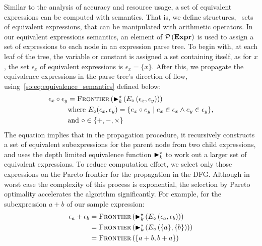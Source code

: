 Similar to the analysis of accuracy and resource usage, a set of equivalent
expressions can be computed with semantics. That is, we define structures,
\ie~sets of equivalent expressions, that can be manipulated with arithmetic
operators. In our equivalent expressions semantics, an element of
$\mathcal{P}\left({\mathbf{Expr}}\right)$ is used to assign a set of expressions to each node
in an expression parse tree. To begin with, at each leaf of the tree, the
variable or constant is assigned a set containing itself, as for $x$, the set
$\epsilon_x$ of equivalent expressions is $\epsilon_x = \{x\}$. After this, we
propagate the equivalence expressions in the parse tree's direction of flow,
using~\eqref{so:eq:equivalence_semantics} defined below:
\begin{equation}
    \begin{aligned}
        \epsilon_x \circ \epsilon_y &= \operatorname{\textsc{Frontier}}\left(
            \operatorname{\blacktriangleright}^\star_k \left(
                E_\circ \left( \epsilon_x, \epsilon_y \right)
            \right) \right) \\
        & \text{where~}
        E_\circ(\epsilon_x, \epsilon_y) = \{
            e_x \circ e_y \mid e_x \in \epsilon_x \wedge e_y \in \epsilon_y
        \}, \\
        & \text{and~} \circ\in\{+, -, \times\}
    \end{aligned}
    \label{so:eq:equivalence_semantics}
\end{equation}
The equation implies that in the propagation procedure, it recursively
constructs a set of equivalent subexpressions for the parent node from
two child expressions, and uses the depth limited equivalence function
$\operatorname{\blacktriangleright}^\star_k$ to work out a larger set of equivalent expressions. To reduce
computation effort, we select only those expressions on the Pareto frontier
for the propagation in the DFG\@. Although in worst case the complexity of
this process is exponential, the selection by Pareto optimality accelerates
the algorithm significantly. For example, for the subexpression $a + b$ of our
sample expression:
\begin{equation}
    \begin{aligned}
        \epsilon_a + \epsilon_b
            &= \operatorname{\textsc{Frontier}}\left(
                    \operatorname{\blacktriangleright}^\star_k \left(
                        E_\circ \left( \epsilon_a, \epsilon_b \right)
                    \right)
                \right) \\
            &= \operatorname{\textsc{Frontier}}\left(
                    \operatorname{\blacktriangleright}^\star_k \left(
                        E_\circ \left( \{a\}, \{b\} \right)
                    \right)
                \right) \\
            &= \operatorname{\textsc{Frontier}}\left(
                    \{ a + b, b + a \}
                \right)
    \end{aligned}
\end{equation}
